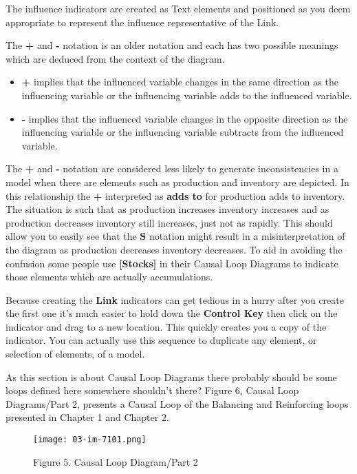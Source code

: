 \documentclass[]{memoir}
\let\Oldincludegraphics\includegraphics
\renewcommand{\includegraphics}[1]{\Oldincludegraphics[max size={\textwidth}{\textheight}]{#1}}
\newcommand{\p}[1]{\textbf{{[}#1{]}}}
\renewcommand{\u}[1]{\textbf{#1}}
\begin{document}
The influence indicators are created as Text elements and positioned as
you deem appropriate to represent the influence representative of the
Link.

The \textbf{+} and \textbf{-} notation is an older notation and each has
two possible meanings which are deduced from the context of the diagram.

\begin{itemize}
\itemsep1pt\parskip0pt
\item
  \textbf{+} implies that the influenced variable changes in the same
  direction as the influencing variable or the influencing variable adds
  to the influenced variable.
\item
  \textbf{-} implies that the influenced variable changes in the
  opposite direction as the influencing variable or the influencing
  variable subtracts from the influenced variable.
\end{itemize}

The \textbf{+} and \textbf{-} notation are considered less likely to
generate inconsistencies in a model when there are elements such as
production and inventory are depicted. In this relationship the
\textbf{+} interpreted as \textbf{adds to} for production adds to
inventory. The situation is such that as production increases inventory
increases and as production decreases inventory still increases, just
not as rapidly. This should allow you to easily see that the \textbf{S}
notation might result in a misinterpretation of the diagram as
production decreases inventory decreases. To aid in avoiding the
confusion some people use \p{Stocks} in their Causal Loop Diagrams to
indicate those elements which are actually accumulations.

Because creating the \u{Link} indicators can get tedious in a hurry
after you create the first one it's much easier to hold down the
\u{Control Key} then click on the indicator and drag to a new location.
This quickly creates you a copy of the indicator. You can actually use
this sequence to duplicate any element, or selection of elements, of a
model.

As this section is about Causal Loop Diagrams there probably should be
some loops defined here somewhere shouldn't there? Figure 6, Causal Loop
Diagrams/Part 2, presents a Causal Loop of the Balancing and Reinforcing
loops presented in Chapter 1 and Chapter 2.

\begin{figure}[htbp]
\centering
\texttt{[image: 03-im-7101.png]}
\caption{Figure 5. Causal Loop Diagram/Part 2}
\end{figure}
\end{document}
